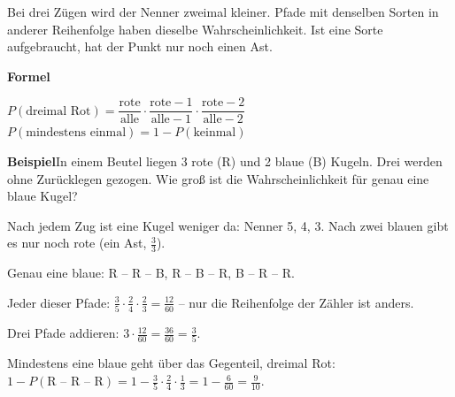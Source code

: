 \documentclass[11pt]{article}
\begin{document}
\clearpage\label{s:C}\noindent\colorbox{black!12}{}\hspace{3mm}{\Large\bfseries Drei Züge}\par\smallskip
\noindent Bei drei Zügen wird der Nenner zweimal kleiner. Pfade mit denselben Sorten in anderer Reihenfolge haben dieselbe Wahrscheinlichkeit. Ist eine Sorte aufgebraucht, hat der Punkt nur noch einen Ast.\par\medskip
\noindent\textbf{Formel}\par\nopagebreak\noindent\hspace*{4mm}\begin{minipage}{\dimexpr\linewidth-4mm\relax}$P(\text{dreimal Rot}) = \dfrac{\text{rote}}{\text{alle}} \cdot \dfrac{\text{rote} - 1}{\text{alle} - 1} \cdot \dfrac{\text{rote} - 2}{\text{alle} - 2}$ \qquad $P(\text{mindestens einmal}) = 1 - P(\text{keinmal})$\end{minipage}\par\medskip
\noindent\textbf{Beispiel}\quad In einem Beutel liegen 3 rote (R) und 2 blaue (B) Kugeln. Drei werden ohne Zurücklegen gezogen. Wie groß ist die Wahrscheinlichkeit für genau eine blaue Kugel?\par\smallskip
\noindent\begin{minipage}[t]{0.6\linewidth}\vspace{0pt}\par\noindent{}Nach jedem Zug ist eine Kugel weniger da: Nenner 5, 4, 3. Nach zwei blauen gibt es nur noch rote (ein Ast, $\frac{3}{3}$).\par\smallskip\par\noindent{}Genau eine blaue: R – R – B, R – B – R, B – R – R.\par\smallskip\par\noindent{}Jeder dieser Pfade: $\frac{3}{5} \cdot \frac{2}{4} \cdot \frac{2}{3} = \frac{12}{60}$ – nur die Reihenfolge der Zähler ist anders.\par\smallskip\par\noindent{}Drei Pfade addieren: $3 \cdot \frac{12}{60} = \frac{36}{60} = \frac{3}{5}$.\par\smallskip\par\noindent{}Mindestens eine blaue geht über das Gegenteil, dreimal Rot: $1 - P(\text{R – R – R}) = 1 - \frac{3}{5} \cdot \frac{2}{4} \cdot \frac{1}{3} = 1 - \frac{6}{60} = \frac{9}{10}$.\par\smallskip\end{minipage}\hfill
\end{document}
